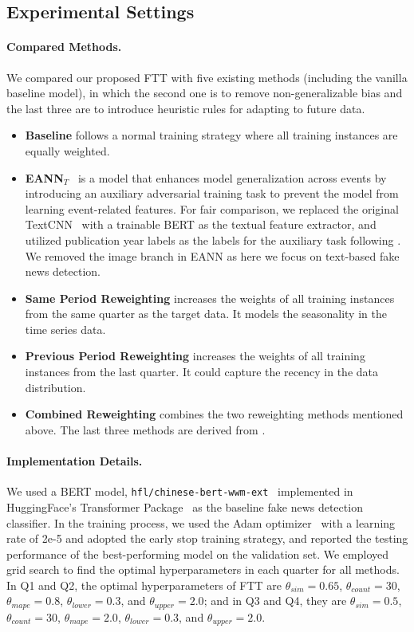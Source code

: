 \documentclass[11pt]{article}
\begin{document}
\subsection{Experimental Settings}
\paragraph{Compared Methods.}
We compared our proposed FTT with five existing methods (including the vanilla baseline model), in which the second one is to remove non-generalizable bias and the last three are to introduce heuristic rules for adapting to future data.

\begin{itemize}
     \item \textbf{Baseline} follows a normal training strategy where all training instances are equally weighted.
     \item \textbf{EANN$_{T}$}~\cite{eann} is a model that enhances model generalization across events by introducing an auxiliary adversarial training task to prevent the model from learning event-related features. For fair comparison, we replaced the original TextCNN~\cite{textcnn} with a trainable BERT as the  textual feature extractor, and utilized publication year labels as the labels for the auxiliary task following \citet{endef}. We removed the image branch in EANN as here we focus on text-based fake news detection.
     \item \textbf{Same Period Reweighting} increases the weights of all training instances from the same quarter as the target data. It models the seasonality in the time series data.
     \item \textbf{Previous Period Reweighting} increases the weights of all training instances from the last quarter. It could capture the recency in the data distribution.
     \item \textbf{Combined Reweighting} combines the two reweighting methods mentioned above. The last three methods are derived from \cite{gaspers-etal-2022-temporal}.
\end{itemize}

\paragraph{Implementation Details.}
We used a BERT model, \texttt{hfl/chinese-bert-wwm-ext}~\cite{chinese-bert} implemented in HuggingFace's Transformer Package~\cite{transformer} as the baseline fake news detection classifier. In the training process, we used the Adam optimizer~\cite{adam} with a learning rate of 2e-5 and adopted the early stop training strategy, and reported the testing performance of the best-performing model on the validation set.
We employed grid search to find the optimal hyperparameters in each quarter for all methods. In Q1 and Q2, the optimal hyperparameters of FTT are $\theta_{sim}=0.65$, $\theta_{count}=30$, $\theta_{mape}=0.8$, $\theta_{lower}=0.3$, and $\theta_{upper}=2.0$; and in Q3 and Q4, they are $\theta_{sim}=0.5$, $\theta_{count}=30$, $\theta_{mape}=2.0$, $\theta_{lower}=0.3$, and $\theta_{upper}=2.0$.
\end{document}
